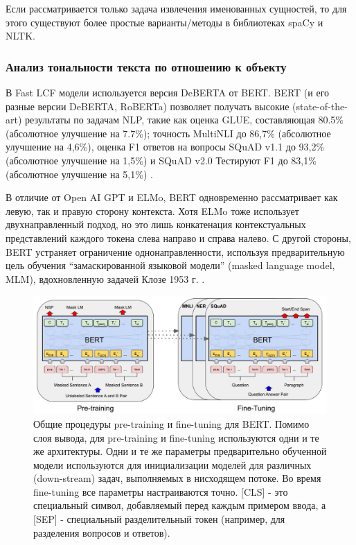 \FloatBarrier %
Если рассматривается только задача извлечения именованных сущностей, то для этого существуют более простые варианты/методы в библиотеках spaCy и NLTK.   

\subsubsection{Анализ тональности текста по отношению к объекту}

В Fast LCF модели используется версия DeBERTA от BERT. BERT (и его разные версии DeBERTA, RoBERTa) позволяет получать высокие (state-of-the-art) результаты по задачам NLP, такие как оценка GLUE, составляющая 80.5\% (абсолютное улучшение на 7.7\%); точность MultiNLI до 86,7\% (абсолютное улучшение на 4,6\%), оценка F1 ответов на вопросы SQuAD v1.1 до 93,2\% (абсолютное улучшение на 1,5\%) и SQuAD v2.0 Тестируют F1 до 83,1\% (абсолютное улучшение на 5,1\%) \cite{Devlin2019BERTPO}.

В отличие от Open AI GPT и ELMo, BERT одновременно рассматривает как левую, так и правую сторону контекста. Хотя ELMo тоже использует двухнаправленный подход, но это лишь конкатенация контекстуальных представлений каждого токена слева направо и справа налево. С другой стороны, BERT устраняет ограничение однонаправленности, используя предварительную цель обучения “замаскированной языковой модели” (masked language model, MLM), вдохновленную задачей Клозе 1953 г. \cite{Devlin2019BERTPO}. 

\begin{figure}[!ht]
    \centering
    \includegraphics[width=1\linewidth]{images/Overall pre-training and fine-tuning procedures for BERT.JPG}
    \caption{Общие процедуры pre-training и fine-tuning для BERT. Помимо слоя вывода, для pre-training и fine-tuning используются одни и те же архитектуры. Одни и те же параметры предварительно обученной модели используются для инициализации моделей для различных (down-stream) задач, выполняемых в нисходящем потоке. Во время fine-tuning все параметры настраиваются точно. [CLS] - это специальный символ, добавляемый перед каждым примером ввода, а [SEP] - специальный разделительный токен (например, для разделения вопросов и ответов).}
    \label{fig:bert-architecture-1}
\end{figure}

